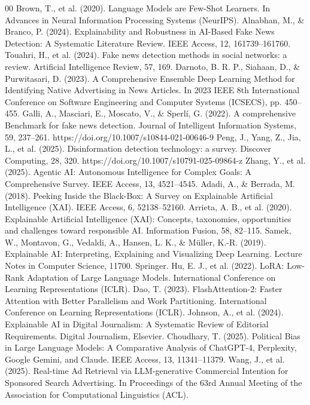 \documentclass{ieeeaccess}
\begin{document}
\begin{thebibliography}{00}
 Brown, T., et al. (2020). Language Models are Few-Shot Learners. In Advances in Neural Information Processing Systems (NeurIPS).
 Alnabhan, M., \& Branco, P. (2024). Explainability and Robustness in AI-Based Fake News Detection: A Systematic Literature Review. IEEE Access, 12, 161739--161760.
 Touahri, H., et al. (2024). Fake news detection methods in social networks: a review. Artificial Intelligence Review, 57, 169.
 Darnoto, B. R. P., Siahaan, D., \& Purwitasari, D. (2023). A Comprehensive Ensemble Deep Learning Method for Identifying Native Advertising in News Articles. In 2023 IEEE 8th International Conference on Software Engineering and Computer Systems (ICSECS), pp. 450--455.
 Galli, A., Masciari, E., Moscato, V., \& Sperlí, G. (2022). A comprehensive Benchmark for fake news detection. Journal of Intelligent Information Systems, 59, 237--261. https://doi.org/10.1007/s10844-021-00646-9
 Peng, J., Yang, Z., Jia, L., et al. (2025). Disinformation detection technology: a survey. Discover Computing, 28, 320. https://doi.org/10.1007/s10791-025-09864-z
 Zhang, Y., et al. (2025). Agentic AI: Autonomous Intelligence for Complex Goals: A Comprehensive Survey. IEEE Access, 13, 4521--4545.
 Adadi, A., \& Berrada, M. (2018). Peeking Inside the Black-Box: A Survey on Explainable Artificial Intelligence (XAI). IEEE Access, 6, 52138--52160.
 Arrieta, A. B., et al. (2020). Explainable Artificial Intelligence (XAI): Concepts, taxonomies, opportunities and challenges toward responsible AI. Information Fusion, 58, 82--115.
 Samek, W., Montavon, G., Vedaldi, A., Hansen, L. K., \& Müller, K.-R. (2019). Explainable AI: Interpreting, Explaining and Visualizing Deep Learning. Lecture Notes in Computer Science, 11700. Springer.
 Hu, E. J., et al. (2022). LoRA: Low-Rank Adaptation of Large Language Models. International Conference on Learning Representations (ICLR).
 Dao, T. (2023). FlashAttention-2: Faster Attention with Better Parallelism and Work Partitioning. International Conference on Learning Representations (ICLR).
 Johnson, A., et al. (2024). Explainable AI in Digital Journalism: A Systematic Review of Editorial Requirements. Digital Journalism, Elsevier.
 Choudhary, T. (2025). Political Bias in Large Language Models: A Comparative Analysis of ChatGPT-4, Perplexity, Google Gemini, and Claude. IEEE Access, 13, 11341--11379.
 Wang, J., et al. (2025). Real-time Ad Retrieval via LLM-generative Commercial Intention for Sponsored Search Advertising. In Proceedings of the 63rd Annual Meeting of the Association for Computational Linguistics (ACL).

\end{thebibliography}
\end{document}
